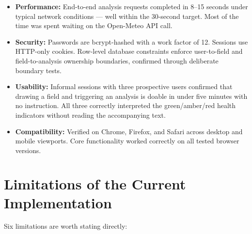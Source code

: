 \documentclass[12pt,a4paper]{report}
\begin{document}
\begin{itemize}
  \item \textbf{Performance:} End-to-end analysis requests completed in 8--15 seconds under typical network conditions — well within the 30-second target. Most of the time was spent waiting on the Open-Meteo API call.

  \item \textbf{Security:} Passwords are bcrypt-hashed with a work factor of 12. Sessions use HTTP-only cookies. Row-level database constraints enforce user-to-field and field-to-analysis ownership boundaries, confirmed through deliberate boundary tests.

  \item \textbf{Usability:} Informal sessions with three prospective users confirmed that drawing a field and triggering an analysis is doable in under five minutes with no instruction. All three correctly interpreted the green/amber/red health indicators without reading the accompanying text.

  \item \textbf{Compatibility:} Verified on Chrome, Firefox, and Safari across desktop and mobile viewports. Core functionality worked correctly on all tested browser versions.
\end{itemize}

\section{Limitations of the Current Implementation}
\label{sec:limitations}

Six limitations are worth stating directly:
\end{document}
